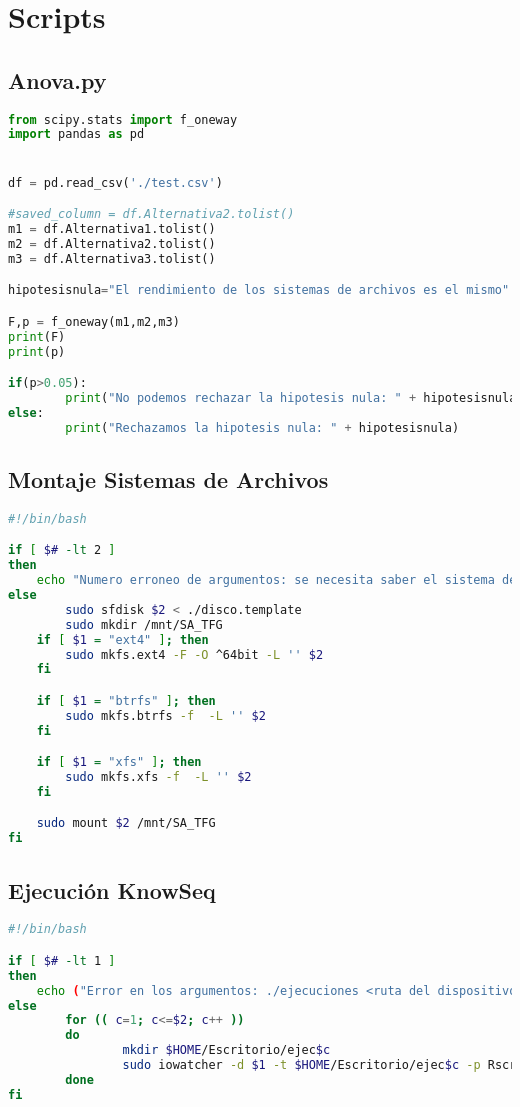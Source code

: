 \chapter{Scripts}

\section{Anova.py}\label{Anova.py}
\begin{lstlisting}[language=python]
from scipy.stats import f_oneway
import pandas as pd


df = pd.read_csv('./test.csv')

#saved_column = df.Alternativa2.tolist()
m1 = df.Alternativa1.tolist()
m2 = df.Alternativa2.tolist()
m3 = df.Alternativa3.tolist()

hipotesisnula="El rendimiento de los sistemas de archivos es el mismo"

F,p = f_oneway(m1,m2,m3)
print(F)
print(p)

if(p>0.05):
        print("No podemos rechazar la hipotesis nula: " + hipotesisnula)
else:
        print("Rechazamos la hipotesis nula: " + hipotesisnula)

\end{lstlisting}
\newpage
\section{Montaje Sistemas de Archivos}\label{montaje.sh}
\begin{lstlisting}[language=bash]
#!/bin/bash

if [ $# -lt 2 ]
then
	echo "Numero erroneo de argumentos: se necesita saber el sistema de archivos, la ruta del dispositivo"
else
		sudo sfdisk $2 < ./disco.template
		sudo mkdir /mnt/SA_TFG 
	if [ $1 = "ext4" ]; then
		sudo mkfs.ext4 -F -O ^64bit -L '' $2
	fi

	if [ $1 = "btrfs" ]; then
		sudo mkfs.btrfs -f  -L '' $2
	fi

	if [ $1 = "xfs" ]; then
		sudo mkfs.xfs -f  -L '' $2
	fi

	sudo mount $2 /mnt/SA_TFG
fi
\end{lstlisting}

\section{Ejecución KnowSeq}\label{knowseq.sh}
\begin{lstlisting}[language=bash]
#!/bin/bash

if [ $# -lt 1 ]
then
	echo ("Error en los argumentos: ./ejecuciones <ruta del dispositivo> <n-ejecuciones>")
else
        for (( c=1; c<=$2; c++ ))
        do  
                mkdir $HOME/Escritorio/ejec$c
                sudo iowatcher -d $1 -t $HOME/Escritorio/ejec$c -p Rscript filesystemKnowSeqTest.R
        done
fi
   
\end{lstlisting}


